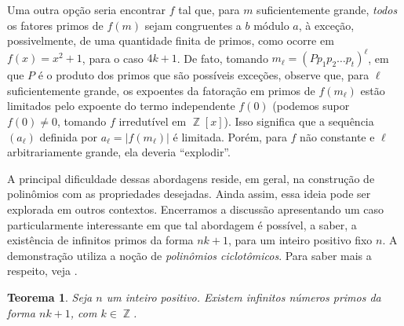 \documentclass{hipatia}
\DeclareMathOperator{\Z}{\mathbb{Z}}
\newtheorem{theorem*}{Teorema}
\begin{document}
Uma outra opção seria encontrar $f$ tal que, para $m$ suficientemente grande, \textit{todos} os fatores primos de $f(m)$ sejam congruentes a $b$ módulo $a$, à exceção, possivelmente, de uma quantidade finita de primos, como ocorre em $f(x)=x^2+1$, para o caso $4k+1$. De fato, tomando $m_\ell=(Pp_1p_2\ldots p_t)^{\ell}$, em que $P$ é o produto dos primos que são possíveis exceções, observe que, para $\ell$ suficientemente grande, os expoentes da fatoração em primos de $f(m_\ell)$ estão limitados pelo expoente do termo independente $f(0)$ (podemos supor $f(0) \ne 0$, tomando $f$ irredutível em $\Z[x]$). Isso significa que a sequência $(a_\ell)$ definida por $a_\ell=|f(m_\ell)|$ é limitada. Porém, para $f$ não constante e $\ell$ arbitrariamente grande, ela deveria ``explodir''.

A principal dificuldade dessas abordagens reside, em geral, na construção de polinômios com as propriedades desejadas. Ainda assim, essa ideia pode ser explorada em outros contextos. Encerramos a discussão apresentando um caso particularmente interessante em que tal abordagem é possível, a saber, a existência de infinitos primos da forma $nk+1$, para um inteiro positivo fixo $n$. A demonstração utiliza a noção de \textit{polinômios ciclotômicos}. Para saber mais a respeito, veja \cite{sanna2022survey}.

\begin{theorem*}
Seja $n$ um inteiro positivo. Existem infinitos números primos da forma $nk+1$, com $k \in \Z$.
\end{theorem*}
\end{document}

